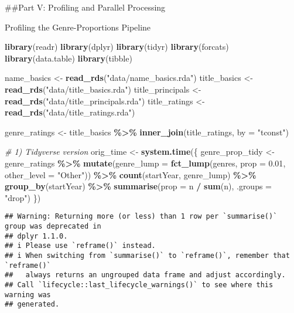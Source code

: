 \documentclass[
]{article}
\author{}
\date{\vspace{-2.5em}}
\newenvironment{Shaded}{\begin{snugshade}}{\end{snugshade}}
\newcommand{\AttributeTok}[1]{\textcolor[rgb]{0.13,0.29,0.53}{#1}}
\newcommand{\CommentTok}[1]{\textcolor[rgb]{0.56,0.35,0.01}{\textit{#1}}}
\newcommand{\FloatTok}[1]{\textcolor[rgb]{0.00,0.00,0.81}{#1}}
\newcommand{\FunctionTok}[1]{\textcolor[rgb]{0.13,0.29,0.53}{\textbf{#1}}}
\newcommand{\NormalTok}[1]{#1}
\newcommand{\OtherTok}[1]{\textcolor[rgb]{0.56,0.35,0.01}{#1}}
\newcommand{\SpecialCharTok}[1]{\textcolor[rgb]{0.81,0.36,0.00}{\textbf{#1}}}
\newcommand{\StringTok}[1]{\textcolor[rgb]{0.31,0.60,0.02}{#1}}
\begin{document}
\#\#Part V: Profiling and Parallel Processing

Profiling the Genre-Proportions Pipeline

\begin{Shaded}
\begin{Highlighting}[]
\FunctionTok{library}\NormalTok{(readr)}
\FunctionTok{library}\NormalTok{(dplyr)}
\FunctionTok{library}\NormalTok{(tidyr)}
\FunctionTok{library}\NormalTok{(forcats)}
\FunctionTok{library}\NormalTok{(data.table)}
\FunctionTok{library}\NormalTok{(tibble)}

\NormalTok{name\_basics      }\OtherTok{\textless{}{-}} \FunctionTok{read\_rds}\NormalTok{(}\StringTok{"data/name\_basics.rda"}\NormalTok{)}
\NormalTok{title\_basics     }\OtherTok{\textless{}{-}} \FunctionTok{read\_rds}\NormalTok{(}\StringTok{"data/title\_basics.rda"}\NormalTok{)}
\NormalTok{title\_principals }\OtherTok{\textless{}{-}} \FunctionTok{read\_rds}\NormalTok{(}\StringTok{"data/title\_principals.rda"}\NormalTok{)}
\NormalTok{title\_ratings    }\OtherTok{\textless{}{-}} \FunctionTok{read\_rds}\NormalTok{(}\StringTok{"data/title\_ratings.rda"}\NormalTok{)}

\NormalTok{genre\_ratings }\OtherTok{\textless{}{-}} 
\NormalTok{  title\_basics }\SpecialCharTok{\%\textgreater{}\%} 
  \FunctionTok{inner\_join}\NormalTok{(title\_ratings, }\AttributeTok{by =} \StringTok{"tconst"}\NormalTok{)}

\CommentTok{\# 1) Tidyverse version}
\NormalTok{orig\_time }\OtherTok{\textless{}{-}} \FunctionTok{system.time}\NormalTok{(\{}
\NormalTok{  genre\_prop\_tidy }\OtherTok{\textless{}{-}}\NormalTok{ genre\_ratings }\SpecialCharTok{\%\textgreater{}\%}
    \FunctionTok{mutate}\NormalTok{(}\AttributeTok{genre\_lump =} \FunctionTok{fct\_lump}\NormalTok{(genres, }\AttributeTok{prop =} \FloatTok{0.01}\NormalTok{, }\AttributeTok{other\_level =} \StringTok{"Other"}\NormalTok{)) }\SpecialCharTok{\%\textgreater{}\%}
    \FunctionTok{count}\NormalTok{(startYear, genre\_lump) }\SpecialCharTok{\%\textgreater{}\%}
    \FunctionTok{group\_by}\NormalTok{(startYear) }\SpecialCharTok{\%\textgreater{}\%}
    \FunctionTok{summarise}\NormalTok{(}\AttributeTok{prop =}\NormalTok{ n }\SpecialCharTok{/} \FunctionTok{sum}\NormalTok{(n), }\AttributeTok{.groups =} \StringTok{"drop"}\NormalTok{)}
\NormalTok{\})}
\end{Highlighting}
\end{Shaded}

\begin{verbatim}
## Warning: Returning more (or less) than 1 row per `summarise()` group was deprecated in
## dplyr 1.1.0.
## i Please use `reframe()` instead.
## i When switching from `summarise()` to `reframe()`, remember that `reframe()`
##   always returns an ungrouped data frame and adjust accordingly.
## Call `lifecycle::last_lifecycle_warnings()` to see where this warning was
## generated.
\end{verbatim}
\end{document}
